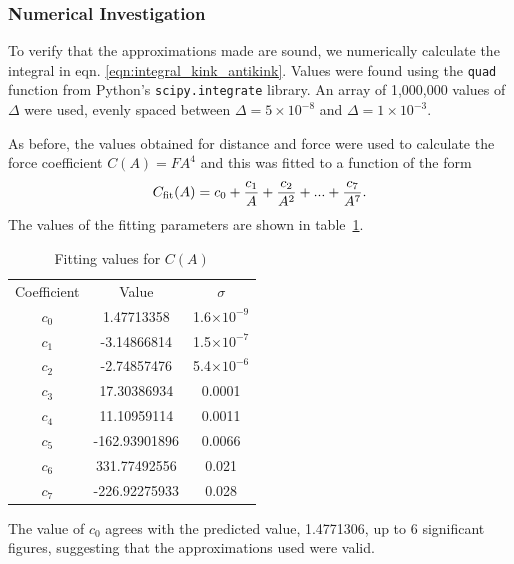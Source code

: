 \documentclass[11pt, oneside]{article}  	%
\numberwithin{equation}{section}
\begin{document}
\subsubsection{Numerical Investigation}
To verify that the approximations made are sound, we numerically calculate the integral in eqn. \ref{eqn:integral_kink_antikink}. Values were found using the \texttt{quad} function from Python's \texttt{scipy.integrate} library. An array of 1,000,000 values of $\Delta$ were used, evenly spaced between $\Delta = 5\times 10^{-8}$ and $\Delta = 1\times 10^{-3}$.\par
As before, the values obtained for distance and force were used to calculate the force coefficient $C(A) = FA^4$ and this was fitted to a function of the form
\begin{align}
C_{\textup{fit}}(A) = c_0 + \frac{c_1}{A} + \frac{c_2}{A^2} + ... + \frac{c_7}{A^7}.
\end{align}
The values of the fitting parameters are shown in table~\ref{table:kink_antikink_gonzales}.\par
\begin{table}[ht]
    \begin{center}
    \caption{Fitting values for $C(A)$}
        \begin{tabular}{|c|c|c|}\label{table:kink_antikink_gonzales}
        Coefficient & Value & $\sigma$\\
        $c_ 0 $ &  1.47713358  &  1.6$\times 10 ^{-9}$\\
        $c_ 1 $ &  -3.14866814  &  1.5$\times 10 ^{-7}$\\
        $c_ 2 $ &  -2.74857476  &  5.4$\times 10 ^{-6}$\\
        $c_ 3 $ &  17.30386934  &  0.0001\\
        $c_ 4 $ &  11.10959114  &  0.0011\\
        $c_ 5 $ &  -162.93901896  &  0.0066\\
        $c_ 6 $ &  331.77492556  &  0.021\\
        $c_ 7 $ &  -226.92275933  &  0.028\\
        \end{tabular}
    \end{center}
\end{table}
The value of $c_0$ agrees with the predicted value, 1.4771306, up to 6 significant figures, suggesting that the approximations used were valid.
\end{document}
